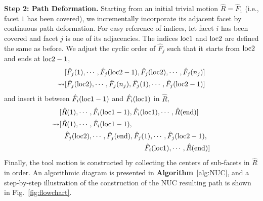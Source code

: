 \documentclass[lettersize,journal]{IEEEtran}
\begin{document}
\textbf{Step 2: Path Deformation. }
Starting from an initial trivial motion $\hat{R} = \hat{F}_{1}$ (i.e., facet $1$ has been covered), we incrementally incorporate its adjacent facet by continuous path deformation. 
For easy reference of indices, let facet $i$ has been covered and facet $j$ is one of its adjacencies. 
The indices $\rm loc1$ and $\rm loc2$ are defined the same as before. 
We adjust the cyclic order of $\hat{F}_j$ such that it starts from ${\rm loc2}$ and ends at ${\rm loc2 - 1}$, 
\begin{equation}
\begin{aligned}
&[\hat{F}_j(1), \cdots, \hat{F}_j({\rm loc2} - 1), \hat{F}_j({\rm loc2}), \cdots, \hat{F}_j(n_j)]\\
\leadsto & [\hat{F}_j({\rm loc2}), \cdots, \hat{F}_j(n_j), \hat{F}_j(1), \cdots, \hat{F}_j({\rm loc2} - 1)]
\end{aligned}
\end{equation}
and insert it between $\hat{F}_i({\rm loc1}-1)$ and $\hat{F}_i({\rm loc1})$ in $\hat{R}$, 
\begin{equation}
\begin{aligned}
&[\hat{R}(1), \cdots, \hat{F}_i({\rm loc1}-1), \hat{F}_i({\rm loc1}), \cdots, \hat{R}({\rm end})]\\
\leadsto&[\hat{R}(1), \cdots, \hat{F}_i({\rm loc1}-1), \\
&~~\hat{F}_j({\rm loc2}), \cdots, \hat{F}_j({\rm end}), \hat{F}_j(1), \cdots, \hat{F}_j({\rm loc2} - 1), \\
&\qquad\qquad\qquad\qquad\qquad\qquad\hat{F}_i({\rm loc1}), \cdots, \hat{R}({\rm end})]
\end{aligned}
\end{equation} 
Finally, the tool motion is constructed by collecting the centers of sub-facets in $\hat{R}$ in order. 
An algorithmic diagram is presented in \textbf{Algorithm}~\ref{alg:NUC}, and a step-by-step illustration of the construction of the NUC resulting path is shown in Fig.~\ref{fig:flowchart}.  






\end{document}
